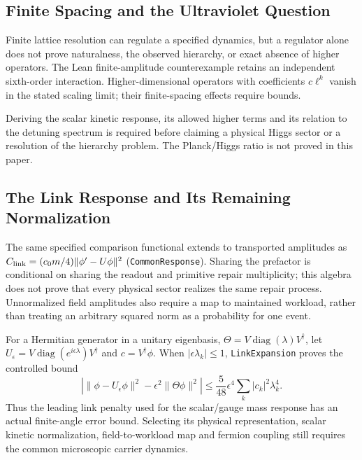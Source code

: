 \subsection{Finite Spacing and the Ultraviolet Question}
\label{subsec:uv_completion}
Finite lattice resolution can regulate a specified dynamics, but a regulator alone does not prove naturalness, the observed hierarchy, or exact absence of higher operators. The Lean finite-amplitude counterexample retains an independent sixth-order interaction. Higher-dimensional operators with coefficients $c\ell^k$ vanish in the stated scaling limit; their finite-spacing effects require bounds.

Deriving the scalar kinetic response, its allowed higher terms and its relation to the detuning spectrum is required before claiming a physical Higgs sector or a resolution of the hierarchy problem. The Planck/Higgs ratio is not proved in this paper.


\subsection{The Link Response and Its Remaining Normalization}
The same specified comparison functional extends to transported amplitudes as
$C_{\rm link}=(c_0m/4)\lVert\phi'-U\phi\rVert^2$
(\nolinkurl{CommonResponse}). Sharing the prefactor is conditional on sharing the
readout and primitive repair multiplicity; this algebra does not prove that every
physical sector realizes the same repair process. Unnormalized field amplitudes
also require a map to maintained workload, rather than treating an arbitrary
squared norm as a probability for one event.

For a Hermitian generator in a unitary eigenbasis,
$\Theta=V\operatorname{diag}(\lambda)V^\dagger$, let
$U_\epsilon=V\operatorname{diag}(e^{i\epsilon\lambda})V^\dagger$ and
$c=V^\dagger\phi$. When $|\epsilon\lambda_k|\leq1$, \nolinkurl{LinkExpansion}
proves the controlled bound
\begin{equation}
 \left|\lVert\phi-U_\epsilon\phi\rVert^2-
 \epsilon^2\lVert\Theta\phi\rVert^2\right|
 \leq\frac5{48}\epsilon^4\sum_k |c_k|^2\lambda_k^4.
\end{equation}
Thus the leading link penalty used for the scalar/gauge mass response has an actual
finite-angle error bound. Selecting its physical representation, scalar kinetic
normalization, field-to-workload map and fermion coupling still requires the common
microscopic carrier dynamics.
